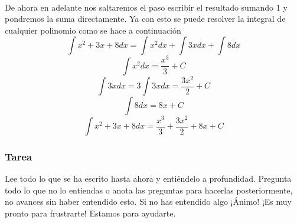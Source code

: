 \documentclass{book}
\begin{document}
            \paragraph{}De ahora en adelante nos saltaremos el paso escribir el resultado sumando 1 y pondremos la suma directamente. Ya con esto se puede resolver la integral de cualquier polinomio como se hace a continuación
            $$\int{x^2+3x+8}dx=\int{x^2}dx+\int{3x}dx+\int{8}dx$$
            $$\int{x^2}dx=\frac{x^3}{3}+C$$
            $$\int{3x}dx=3\int{3x}dx=\frac{3x^2}{2}+C$$
            $$\int{8}dx=8x+C$$
            $$\int{x^2+3x+8}dx=\frac{x^3}{3}+\frac{3x^2}{2}+8x+C$$
            \subsubsection{Tarea}
            Lee todo lo que se ha escrito hasta ahora y entiéndelo a profundidad. Pregunta todo lo que no lo entiendas o anota las preguntas para hacerlas posteriormente, no avances sin haber entendido esto. Si no has entendido algo ¡Ánimo! ¡Es muy pronto para frustrarte! Estamos para ayudarte. 
\end{document}
